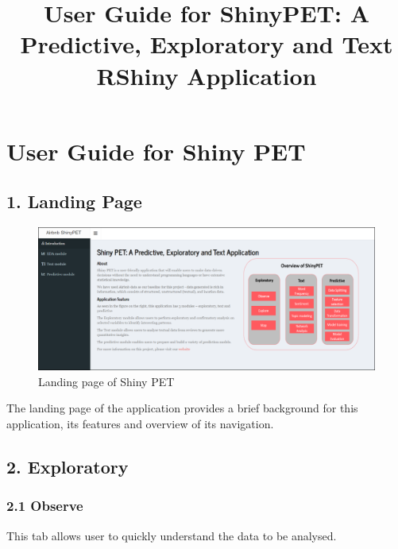 \documentclass[
  12pt,
]{article}
\title{User Guide for ShinyPET: A Predictive, Exploratory and Text
RShiny Application}
\author{}
\date{\vspace{-2.5em}}
\begin{document}
\maketitle

{
\setcounter{tocdepth}{3}
\tableofcontents
}
\newpage

\hypertarget{user-guide-for-shiny-pet}{%
\section{User Guide for Shiny PET}\label{user-guide-for-shiny-pet}}

\hypertarget{landing-page}{%
\subsection{1. Landing Page}\label{landing-page}}

\begin{figure}[H]

{\centering \includegraphics[width=1\linewidth]{images/intro} 

}

\caption{Landing page of Shiny PET}\label{fig:unnamed-chunk-1}
\end{figure}

The landing page of the application provides a brief background for this
application, its features and overview of its navigation.

\hypertarget{exploratory}{%
\subsection{2. Exploratory}\label{exploratory}}

\hypertarget{observe}{%
\subsubsection{2.1 Observe}\label{observe}}

This tab allows user to quickly understand the data to be analysed.
\end{document}
